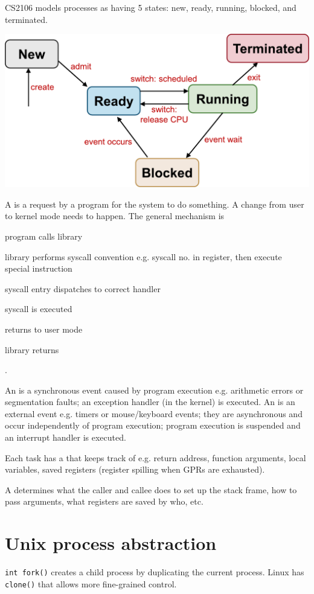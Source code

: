 \documentclass[10pt]{slnotes}
\begin{document}
CS2106 models processes as having 5 states: new, ready, running, blocked, and terminated.

\includegraphics[width=\columnwidth]{pstates.pdf}

A  is a request by a program for the system to do something. A change from user to kernel mode needs to happen. The general mechanism is \begin{slinenum}
\item program calls library
\item library performs syscall convention e.g. syscall no. in register, then execute special instruction
\item syscall entry dispatches to correct handler
\item syscall is executed
\item returns to user mode
\item library returns
\end{slinenum}.

An  is a synchronous event caused by program execution e.g. arithmetic errors or segmentation faults; an exception handler (in the kernel) is executed. An  is an external event e.g. timers or mouse/keyboard events; they are asynchronous and occur independently of program execution; program execution is suspended and an interrupt handler is executed.

Each task has a  that keeps track of e.g. return address, function arguments, local variables, saved registers (register spilling when GPRs are exhausted).

A  determines what the caller and callee does to set up the stack frame, how to pass arguments, what registers are saved by who, etc.

\section{Unix process abstraction}
\texttt{int fork()} creates a child process by duplicating the current process. Linux has \texttt{clone()} that allows more fine-grained control.
\end{document}
